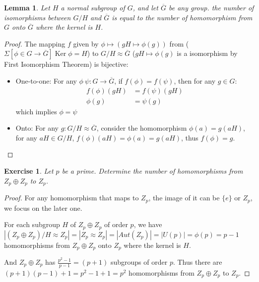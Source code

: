 \documentclass[14pt]{extarticle}
\newtheorem{exercise}{Exercise}[section]
\newtheorem*{lemma}{Lemma}
\newcommand{\1}{\{ e \}}
\DeclareMathOperator{\Ker}{Ker}
\begin{document}
\begin{lemma}
  Let $H$ a normal subgroup of $G$, and let $\overline{G}$ be any group.
  the number of isomorphisms between $G/H$ and $\overline{G}$
  is equal to
  the number of homomorphism from $G$ onto $\overline{G}$ where the kernel is $H$.
\end{lemma}
\begin{proof}
  The mapping $f$ given by $\phi \mapsto (gH \mapsto \phi(g))$
  from ($\Sigma [ \phi \in G \rightarrow \overline{G} ] \Ker \phi = H $) 
  to $G/H \approx \overline{G}$ ($gH \mapsto \phi(g)$ is a isomorphism by First Isomorphism Theorem) 
  is bijective:
  \begin{itemize}
    \item One-to-one: For any $\phi \ \psi : G \rightarrow \overline{G}$, 
      if $f(\phi) = f(\psi)$, then for any $g \in G$:
      \begin{align*}
        f(\phi)(gH) &= f(\psi)(gH) \\
        \phi(g) &= \psi(g)
      \end{align*}
      which implies $\phi = \psi$
    \item Onto: For any $g : G/H \approx \overline{G}$, consider the homomorphism 
      $\phi(a) = g(aH)$, for any $aH \in G/H$,
      $f(\phi)(aH) = \phi(a) = g(aH)$, thus $f(\phi) = g$.
  \end{itemize}
\end{proof}

\setcounter{exercise}{75}
\begin{exercise}
  Let $p$ be a prime. Determine the number of homomorphisms from $Z_p \oplus Z_p$ to $Z_p$.
\end{exercise}
\begin{proof}
  For any homomorphism that maps to $Z_p$, the image of it can be $\1$ or $Z_p$,
  we focus on the later one.

  For each subgroup $H$ of $Z_p \oplus Z_p$ of order $p$,
  we have $|(Z_p \oplus Z_p) / H \approx Z_p| = |Z_p \approx Z_p| = |Aut(Z_p)| = |U(p)| = \phi(p) = p - 1$
  homomorphisms from $Z_p \oplus Z_p$ onto $Z_p$ where the kernel is $H$.

  And $Z_p \oplus Z_p$ has $\displaystyle \frac{p^2 - 1}{p - 1} = (p + 1)$
  subgroups of order $p$.
  Thus there are $(p + 1)(p - 1) + 1 = p^2 - 1 + 1 = p^2$ homomorphisms from $Z_p \oplus Z_p$ to $Z_p$.
\end{proof}
\end{document}
